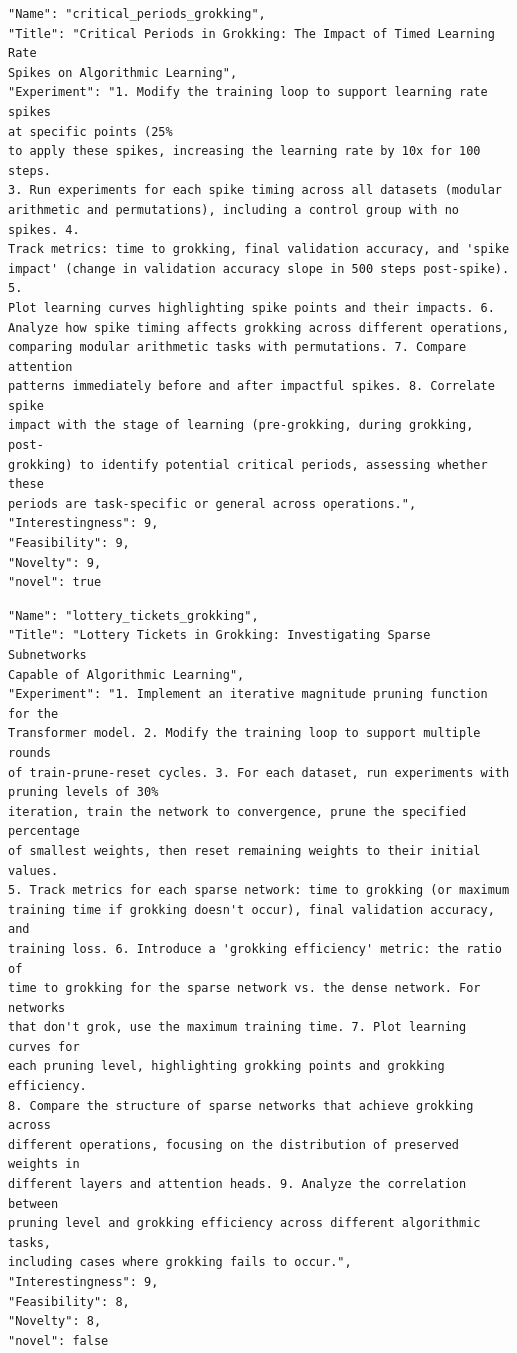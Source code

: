\begin{tcolorbox}[breakable,colback=blue!5!white, colframe=blue!75!black, title=Idea 19/50 - \texttt{critical\_periods\_grokking}]
\small
\begin{verbatim}
"Name": "critical_periods_grokking",
"Title": "Critical Periods in Grokking: The Impact of Timed Learning Rate
Spikes on Algorithmic Learning",
"Experiment": "1. Modify the training loop to support learning rate spikes
at specific points (25%
to apply these spikes, increasing the learning rate by 10x for 100 steps.
3. Run experiments for each spike timing across all datasets (modular
arithmetic and permutations), including a control group with no spikes. 4.
Track metrics: time to grokking, final validation accuracy, and 'spike
impact' (change in validation accuracy slope in 500 steps post-spike). 5.
Plot learning curves highlighting spike points and their impacts. 6.
Analyze how spike timing affects grokking across different operations,
comparing modular arithmetic tasks with permutations. 7. Compare attention
patterns immediately before and after impactful spikes. 8. Correlate spike
impact with the stage of learning (pre-grokking, during grokking, post-
grokking) to identify potential critical periods, assessing whether these
periods are task-specific or general across operations.",
"Interestingness": 9,
"Feasibility": 9,
"Novelty": 9,
"novel": true
\end{verbatim}
\end{tcolorbox}

\begin{tcolorbox}[breakable,colback=blue!5!white, colframe=blue!75!black, title=Idea 20/50 - \texttt{lottery\_tickets\_grokking}]
\small
\begin{verbatim}
"Name": "lottery_tickets_grokking",
"Title": "Lottery Tickets in Grokking: Investigating Sparse Subnetworks
Capable of Algorithmic Learning",
"Experiment": "1. Implement an iterative magnitude pruning function for the
Transformer model. 2. Modify the training loop to support multiple rounds
of train-prune-reset cycles. 3. For each dataset, run experiments with
pruning levels of 30%
iteration, train the network to convergence, prune the specified percentage
of smallest weights, then reset remaining weights to their initial values.
5. Track metrics for each sparse network: time to grokking (or maximum
training time if grokking doesn't occur), final validation accuracy, and
training loss. 6. Introduce a 'grokking efficiency' metric: the ratio of
time to grokking for the sparse network vs. the dense network. For networks
that don't grok, use the maximum training time. 7. Plot learning curves for
each pruning level, highlighting grokking points and grokking efficiency.
8. Compare the structure of sparse networks that achieve grokking across
different operations, focusing on the distribution of preserved weights in
different layers and attention heads. 9. Analyze the correlation between
pruning level and grokking efficiency across different algorithmic tasks,
including cases where grokking fails to occur.",
"Interestingness": 9,
"Feasibility": 8,
"Novelty": 8,
"novel": false
\end{verbatim}
\end{tcolorbox}


